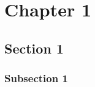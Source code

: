 \documentclass[12pt,a4paper]{book}
\title{}
\author{Branden Glass}
\date{} %
\begin{document}
\maketitle
\tableofcontents

\chapter{Chapter 1}
\section{Section 1}
\subsection{Subsection 1}
\end{document}
